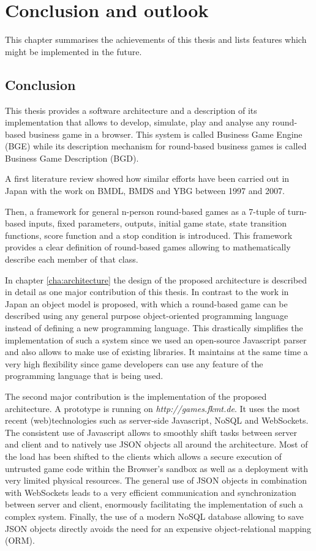 \chapter{Conclusion and outlook}
\label{cha:conclusion}

This chapter summarises the achievements of this thesis and lists features which might be implemented in the future.

\section{Conclusion}
\label{sec:conclusion}

This thesis provides a software architecture and a description of its implementation that allows to develop, simulate, play and analyse any round-based business game in a browser. This system is called Business Game Engine (BGE) while its description mechanism for round-based business games is called Business Game Description (BGD).

A first literature review showed how similar efforts have been carried out in Japan with the work on BMDL, BMDS and YBG between 1997 and 2007. 

Then, a framework for general n-person round-based games as a 7-tuple of turn-based inputs, fixed  parameters, outputs, initial game state, state transition functions, score function and a stop condition is introduced. This framework provides a clear definition of round-based games allowing to mathematically describe each member of that class.

In chapter \ref{cha:architecture} the design of the proposed architecture is described in detail as one major contribution of this thesis. In contrast to the work in Japan an object model is proposed, with which a round-based game can be described using any general purpose object-oriented programming language instead of defining a new programming language. This drastically simplifies the implementation of such a system since we used an open-source Javascript parser and also allows to make use of existing libraries. It maintains at the same time a very high flexibility since game developers can use any feature of the programming language that is being used. 

The second major contribution is the implementation of the proposed architecture. A prototype is running on \textit{http://games.fkmt.de}. It uses the most recent (web)technologies such as server-side Javascript, NoSQL and WebSockets. The consistent use of Javascript allows to smoothly shift tasks between server and client and to natively use JSON objects all around the architecture. Most of the load has been shifted to the clients which allows a secure execution of untrusted game code within the Browser's sandbox as well as a deployment with very limited physical resources. The general use of JSON objects in combination with WebSockets leads to a very efficient communication and synchronization between server and client, enormously facilitating the implementation of such a complex system. Finally, the use of a modern NoSQL database allowing to save JSON objects directly avoids the need for an expensive object-relational mapping (ORM).

